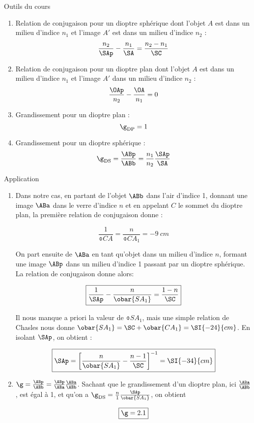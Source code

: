\documentclass[10pt,a5paper,notitlepage]{book}
\begin{document}
\begin{NCdemo}{Outils du cours}
    \begin{enumerate}
        \item Relation de conjugaison pour un dioptre sphérique dont l'objet
            $A$ est dans un milieu d'indice $n_1$ et l'image $A'$ est dans un
            milieu d'indice $n_2$ :
            \[ \frac{n_2}{\SAp} - \frac{n_1}{\SA} = \frac{n_2 - n_1}{\SC}\]
        \item Relation de conjugaison pour un dioptre plan dont l'objet $A$ est
            dans un milieu d'indice $n_1$ et l'image $A'$ dans un milieu
            d'indice $n_2$ :
            \[ \frac{\OAp}{n_2} - \frac{\OA}{n_1} = 0 \]
        \item Grandissement pour un dioptre plan :
            \[ \g _\mathrm{DP} = 1 \]
        \item Grandissement pour un dioptre sphérique :
            \[ \g _\mathrm{DS} = \frac{\ABp}{\ABb} = \frac{n_1}{n_2}
            \frac{\SAp}{\SA}\]
    \end{enumerate}
\end{NCdemo}

\begin{NCexem}{Application}
    \begin{enumerate}

        \item Dans notre cas, en partant de l'objet $\ABb$ dans l'air d'indice
            1, donnant une image $\ABa$ dans le verre d'indice $n$ et en
            appelant $C$ le sommet du dioptre plan, la première relation de
            conjugaison donne :

            \[ \boxed{ \frac{1}{\obar{CA}} = \frac{n}{\obar{CA_1}} =
            \SI{-9}{cm}} \]
            
            On part ensuite de $\ABa$ en tant qu'objet dans un milieu d'indice
            $n$, formant une image $\ABp$ dans un milieu d'indice 1 passant par
            un dioptre sphérique. La relation de conjugaison donne alors:
            
            \[ \boxed{ \frac{1}{\SAp} - \frac{n}{\obar{SA_1}} = \frac{1 -
            n}{\SC}}\]
            
            Il nous manque a priori la valeur de $\obar{SA_1}$, mais une simple
            relation de Chasles nous donne $\obar{SA_1} = \SC + \obar{CA_1} =
            \SI{-24}{cm}$. En isolant $\SAp$, on obtient :
            
            \[ \boxed{\SAp = \left[ \frac{n}{\obar{SA_1}} - \frac{n -
            1}{\SC}\right]^{-1} = \SI{-34}{cm}}\]

        \item $\g = \frac{\ABp}{\ABb} = \frac{\ABp}{\ABa} \frac{\ABa}{\ABb}$.
            Sachant que le grandissement d'un dioptre plan, ici $
            \frac{\ABa}{\ABb}$, est égal à 1, et qu'on a $\g _\mathrm{DS} =
            \frac{n}{1} \frac{\SAp}{\obar{SA_1}}$, on obtient

            \[ \boxed{\g = 2.1}\]
    \end{enumerate}
    \end{NCexem}
\end{document}
